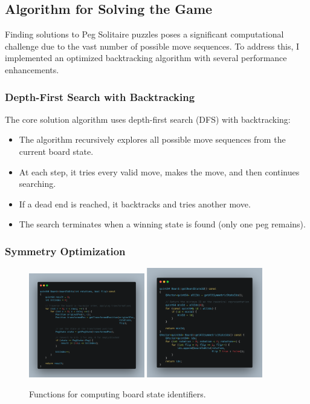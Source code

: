 \subsection{Algorithm for Solving the Game}
Finding solutions to Peg Solitaire puzzles poses a significant computational challenge due to the vast number of possible move sequences. To address this, I implemented an optimized backtracking algorithm with several performance enhancements.\cite{Harder_PegSolitaire_2012}

\subsubsection{Depth-First Search with Backtracking}
The core solution algorithm uses depth-first search (DFS) with backtracking:
\begin{itemize}
    \item The algorithm recursively explores all possible move sequences from the current board state.
    \item At each step, it tries every valid move, makes the move, and then continues searching.
    \item If a dead end is reached, it backtracks and tries another move.
    \item The search terminates when a winning state is found (only one peg remains).
\end{itemize}

\subsubsection{Symmetry Optimization}

\begin{figure}[btp]
    \centering
    \includegraphics[width=0.45\textwidth]{resource/code-examples/boardToBits.png}
    \includegraphics[width=0.45\textwidth]{resource/code-examples/getBoardStateId.png}
    \caption{Functions for computing board state identifiers.}
    \label{fig:board-state-id}
\end{figure}

